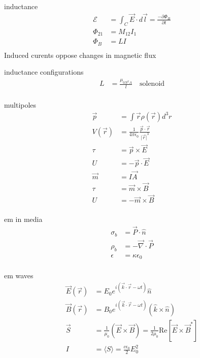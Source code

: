 \documentclass[avery5388, frame, grid]{flashcards}
\begin{document}
\begin{flashcard}{inductance}
  {
    \begin{align*}
      \mathcal{E} &= \int_{C} \vec{E} \cdot d\vec{l} = \frac{- \partial \Phi_{B}}{\partial t}\\
      \Phi_{21} &= M_{12} I_{1}\\
      \Phi_{B} &= L I\\
    \end{align*}
    Induced curents oppose changes in magnetic flux
  }
\end{flashcard}

\begin{flashcard}{inductance configurations}
  {
    \begin{align*}
      L &= \frac{\mu_{0 N^{2} A}}{l} \quad \textrm{solenoid}\\
    \end{align*}
  }
\end{flashcard}

\begin{flashcard}{multipoles}
  {
    \begin{align*}
      \vec{p} &= \int \vec{r} \rho(\vec{r}) d^{3}r\\
      V(\vec{r}) &= \frac{1}{4 \pi \epsilon_{0}} \frac{\vec{p} \cdot \vec{r}}{{\lvert \vec{r} \lvert}^{3}}\\
      \tau &= \vec{p} \times \vec{E}\\
      U &= - \vec{p} \cdot \vec{E}\\
      \vec{m} &= I \vec{A}\\
      \tau &= \vec{m} \times \vec{B}\\
      U &= - \vec{m} \times \vec{B}\\
    \end{align*}
  }
\end{flashcard}

\begin{flashcard}{em in media}
  {
    \begin{align*}
      \sigma_{b} &= \vec{P} \cdot \hat{n}\\
      \rho_{b} &= - \vec{\nabla} \cdot \vec{P}\\
      \epsilon &= \kappa \epsilon_{0}\\
    \end{align*}
  }
\end{flashcard}

\begin{flashcard}{em waves}
  {
    \begin{align*}
      \vec{E}(\vec{r}) &= E_{0} e^{i(\vec{k} \cdot \vec{r} - \omega t)} \hat{n}\\
      \vec{B}(\vec{r}) &= B_{0} e^{i(\vec{k} \cdot \vec{r} - \omega t)} (\hat{k} \times \hat{n})\\
      \vec{S} &= \frac{1}{\mu_{0}} (\vec{E} \times \vec{B}) = \frac{1}{2 \mu_{0}} \textrm{Re}[\vec{E} \times \vec{B}^{*}]\\
      I &= \langle S \rangle = \frac{c \epsilon_{0}}{2} E_{0}^{2}
    \end{align*}
  }
\end{flashcard}
\end{document}
